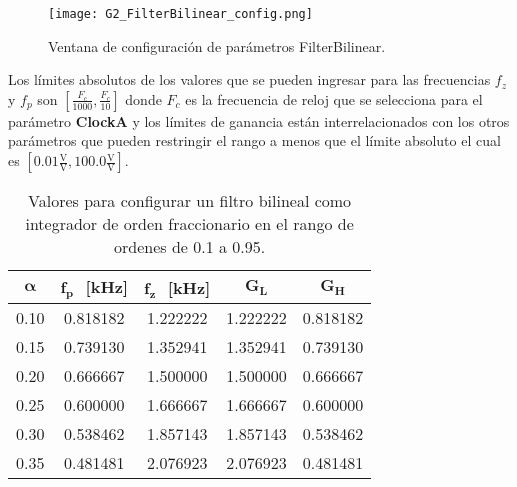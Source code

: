 	\begin{figure}[!ht] 
		\caption{Ventana de configuración de parámetros FilterBilinear.}
		\label{fig:G2_FilterBilinear_config}
		\centering
		\texttt{[image: G2\_FilterBilinear\_config.png]}
	\end{figure}

	Los límites absolutos de los valores que se pueden ingresar para las frecuencias $f_{z}$ y $f_{p}$ son $[\frac{F_{c}}{1000}, \frac{F_{c}}{10}]$ donde $F_{c}$ es la frecuencia de reloj que se selecciona para el parámetro \textbf{ClockA} y los límites de ganancia están interrelacionados con los otros parámetros que pueden restringir el rango a menos que el límite absoluto el cual es $\left[0.01 \frac{\mathrm{V}}{\mathrm{V}}, 100.0\frac{\mathrm{V}}{\mathrm{V}} \right]$.  

	\begin{table}[!hbp]                                      
		\centering   
		\caption{Valores para configurar un filtro bilineal como integrador de orden fraccionario en el rango de ordenes de 0.1 a 0.95.}                            
		\label{tab:calculos_bilineal}                                        
			\begin{tabular}{ccccc}                        
			\hline                                              
			$\bm{\alpha}$ & $\bm{f_{p}}\,\,$ [kHz] & $\bm{f_{z}}\,\,$ [kHz] & $\bm{G_{L}}$ & $\bm{G_{H}}$ \\            
			\hline                                              
			0.10 & 0.818182 & 1.222222 & 1.222222 & 0.818182 \\  
			                                              
			0.15 & 0.739130 & 1.352941 & 1.352941 & 0.739130 \\  
			                                            
			0.20 & 0.666667 & 1.500000 & 1.500000 & 0.666667 \\  
			                                              
			0.25 & 0.600000 & 1.666667 & 1.666667 & 0.600000 \\  
			                                              
			0.30 & 0.538462 & 1.857143 & 1.857143 & 0.538462 \\  
			                                              
			0.35 & 0.481481 & 2.076923 & 2.076923 & 0.481481 \\  
			                                              

\end{tabular}
\end{table}
